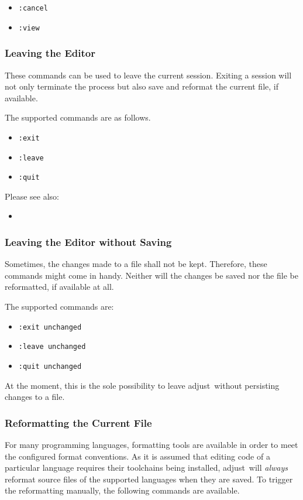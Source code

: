 \documentclass[11pt, a4paper, british]{scrartcl}
\DeclareRobustCommand{\adjust}{\textsf{adjust}}
\begin{document}
\begin{itemize}
\item \texttt{:cancel}
\item \texttt{:view}
\end{itemize}

\subsubsection{Leaving the Editor}
\label{sec:leaving-the-editor}
These commands can be used to leave the current session.  Exiting a session will
not only terminate the process but also save and reformat the current file, if
available.

The supported commands are as follows.

\begin{itemize}
\item \texttt{:exit}
\item \texttt{:leave}
\item \texttt{:quit}
\end{itemize}

Please see also:

\begin{itemize}
\item {}
\end{itemize}

\subsubsection{Leaving the Editor without Saving}
\label{sec:leaving-the-editor-without-saving}
Sometimes, the changes made to a file shall not be kept.  Therefore, these
commands might come in handy.  Neither will the changes be saved nor the file be
reformatted, if available at all.

The supported commands are:

\begin{itemize}
\item \texttt{:exit unchanged}
\item \texttt{:leave unchanged}
\item \texttt{:quit unchanged}
\end{itemize}

At the moment, this is the sole possibility to leave \adjust\ without persisting
changes to a file.

\subsubsection{Reformatting the Current File}
\label{sec:reformatting-the-current-file}
For many programming languages, formatting tools are available in order to meet
the configured format conventions.  As it is assumed that editing code of a
particular language requires their toolchains being installed, \adjust\ will
\emph{always} reformat source files of the supported languages when they are
saved.  To trigger the reformatting manually, the following commands are
available.
\end{document}

